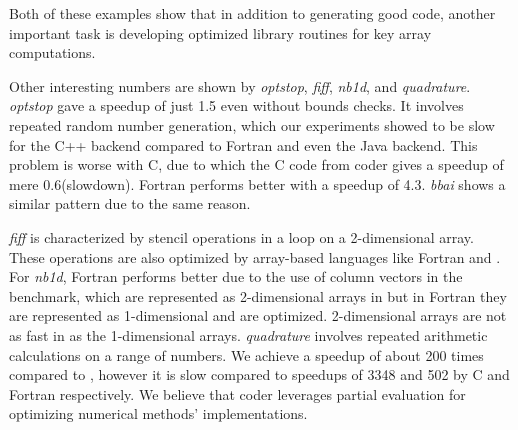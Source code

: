 Both of these examples show that in addition to generating good code,
another important task is developing optimized \xten library routines for key
array computations.

Other interesting numbers are shown by \emph{optstop},
\emph{fiff}, \emph{nb1d}, and \emph{quadrature}.  \emph{optstop} gave a speedup
of just 1.5 even without bounds checks. It involves repeated random number
generation, which our experiments showed to be slow for the \xten C++ backend
compared to Fortran and even the Java backend.  This problem is worse with C,
due to which the C code from \matlab coder gives a speedup of mere
0.6(slowdown). Fortran performs better with a speedup of 4.3.  \emph{bbai}
shows a similar pattern due to the same reason. 

\emph{fiff} is characterized by stencil
operations in a loop on a 2-dimensional array. These operations are also
optimized by array-based languages like Fortran and \matlab.  For \emph{nb1d},
Fortran performs better due to the use of column vectors in the benchmark, which
are represented as 2-dimensional arrays in \xten but in Fortran they are
represented as 1-dimensional and are optimized. 2-dimensional arrays are not as
fast in \xten as the 1-dimensional arrays.  \emph{quadrature} involves repeated
arithmetic calculations on a range of numbers. We achieve a speedup of about 200
times compared to \matlab, however it is slow compared to speedups of 3348 and
502 by C and Fortran respectively.  We believe that \matlab coder leverages
partial evaluation for optimizing numerical methods' implementations.

